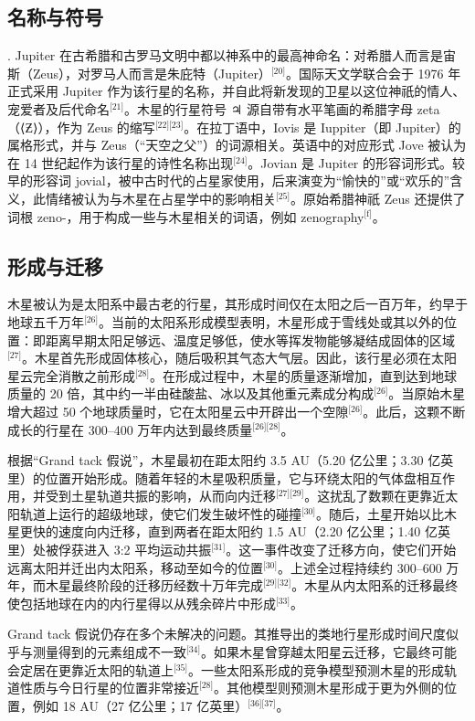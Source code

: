 \subsection{名称与符号}.
Jupiter 在古希腊和古罗马文明中都以神系中的最高神命名：对希腊人而言是宙斯（Zeus），对罗马人而言是朱庇特（Jupiter）\(^\text{[20]}\)。国际天文学联合会于 1976 年正式采用 Jupiter 作为该行星的名称，并自此将新发现的卫星以这位神祇的情人、宠爱者及后代命名\(^\text{[21]}\)。木星的行星符号 ♃ 源自带有水平笔画的希腊字母 zeta（⟨Ƶ⟩），作为 Zeus 的缩写\(^\text{[22][23]}\)。在拉丁语中，Iovis 是 Iuppiter（即 Jupiter）的属格形式，并与 Zeus（“天空之父”）的词源相关。英语中的对应形式 Jove 被认为在 14 世纪起作为该行星的诗性名称出现\(^\text{[24]}\)。Jovian 是 Jupiter 的形容词形式。较早的形容词 jovial，被中古时代的占星家使用，后来演变为“愉快的”或“欢乐的”含义，此情绪被认为与木星在占星学中的影响相关\(^\text{[25]}\)。原始希腊神祇 Zeus 还提供了词根 zeno-，用于构成一些与木星相关的词语，例如 zenography\(^\text{[f]}\)。
\subsection{形成与迁移}
木星被认为是太阳系中最古老的行星，其形成时间仅在太阳之后一百万年，约早于地球五千万年\(^\text{[26]}\)。当前的太阳系形成模型表明，木星形成于雪线处或其以外的位置：即距离早期太阳足够远、温度足够低，使水等挥发物能够凝结成固体的区域\(^\text{[27]}\)。木星首先形成固体核心，随后吸积其气态大气层。因此，该行星必须在太阳星云完全消散之前形成\(^\text{[28]}\)。在形成过程中，木星的质量逐渐增加，直到达到地球质量的 20 倍，其中约一半由硅酸盐、冰以及其他重元素成分构成\(^\text{[26]}\)。当原始木星增大超过 50 个地球质量时，它在太阳星云中开辟出一个空隙\(^\text{[26]}\)。此后，这颗不断成长的行星在 300–400 万年内达到最终质量\(^\text{[26][28]}\)。

根据“Grand tack 假说”，木星最初在距太阳约 3.5 AU（5.20 亿公里；3.30 亿英里）的位置开始形成。随着年轻的木星吸积质量，它与环绕太阳的气体盘相互作用，并受到土星轨道共振的影响，从而向内迁移\(^\text{[27][29]}\)。这扰乱了数颗在更靠近太阳轨道上运行的超级地球，使它们发生破坏性的碰撞\(^\text{[30]}\)。随后，土星开始以比木星更快的速度向内迁移，直到两者在距太阳约 1.5 AU（2.20 亿公里；1.40 亿英里）处被俘获进入 3:2 平均运动共振\(^\text{[31]}\)。这一事件改变了迁移方向，使它们开始远离太阳并迁出内太阳系，移动至如今的位置\(^\text{[30]}\)。上述全过程持续约 300–600 万年，而木星最终阶段的迁移历经数十万年完成\(^\text{[29][32]}\)。木星从内太阳系的迁移最终使包括地球在内的内行星得以从残余碎片中形成\(^\text{[33]}\)。

Grand tack 假说仍存在多个未解决的问题。其推导出的类地行星形成时间尺度似乎与测量得到的元素组成不一致\(^\text{[34]}\)。如果木星曾穿越太阳星云迁移，它最终可能会定居在更靠近太阳的轨道上\(^\text{[35]}\)。一些太阳系形成的竞争模型预测木星的形成轨道性质与今日行星的位置非常接近\(^\text{[28]}\)。其他模型则预测木星形成于更为外侧的位置，例如 18 AU（27 亿公里；17 亿英里）\(^\text{[36][37]}\)。


